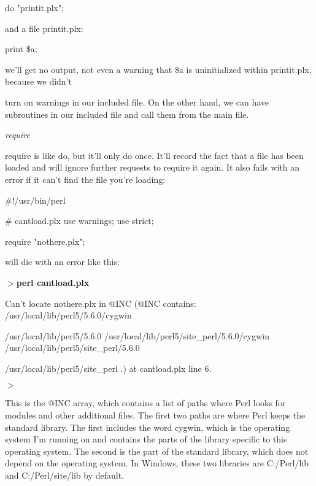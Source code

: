 \documentclass[a4paper,11pt]{book}
\begin{document}
\noindent do "printit.plx";

\noindent 

\noindent and a file printit.plx:

\noindent 

\noindent print \$a;

\noindent 

\noindent 

\noindent we'll get no output, not even a warning that \$a is uninitialized within printit.plx, because we didn't

\noindent turn on warnings in our included file. On the other hand, we can have subroutines in our included file and call them from the main file.

\noindent 

\noindent \textit{require}

\noindent require is like do, but it'll only do once. It'll record the fact that a file has been loaded and will ignore further requests to require it again. It also fails with an error if it can't find the file you're loading:

\noindent 

\noindent 

\noindent \#!/usr/bin/perl

\noindent \# cantload.plx use warnings; use strict;

\noindent 

\noindent require "nothere.plx";

\noindent 

\noindent will die with an error like this:

\noindent 

\noindent $>$\textbf{perl cantload.plx}

\noindent Can't locate nothere.plx in @INC (@INC contains: /usr/local/lib/perl5/5.6.0/cygwin

\noindent /usr/local/lib/perl5/5.6.0 /usr/local/lib/perl5/site\_perl/5.6.0/cygwin /usr/local/lib/perl5/site\_perl/5.6.0

\noindent /usr/local/lib/perl5/site\_perl .) at cantload.plx line 6.

\noindent $>$

\noindent 

\noindent This is the @INC array, which contains a list of paths where Perl looks for modules and other additional files. The first two paths are where Perl keeps the standard library. The first includes the word cygwin, which is the operating system I'm running on and contains the parts of the library specific to this operating system. The second is the part of the standard library, which does not depend on the operating system. In Windows, these two libraries are C:/Perl/lib and C:/Perl/site/lib by default.
\end{document}
